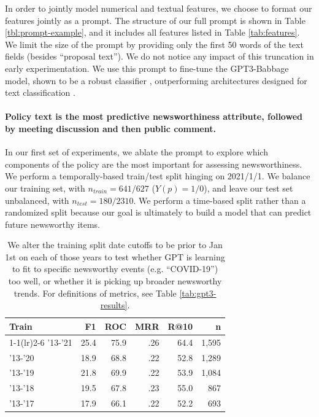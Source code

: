 \documentclass[11pt]{article}
\begin{document}
In order to jointly model numerical and textual features, we choose to format our features jointly as a prompt. The structure of our full prompt is shown in Table \ref{tbl:prompt-example}, and it includes all features listed in Table \ref{tab:features}. We limit the size of the prompt by providing only the first 50 words of the text fields (besides ``proposal text''). We do not notice any impact of this truncation in early experimentation. We use this prompt to fine-tune the GPT3-Babbage model, shown to be a robust classifier \cite{spangher2023identifying}, outperforming architectures designed for text classification \cite{spangher2021multitask}. %

\paragraph{Policy text is the most predictive newsworthiness attribute, followed by meeting discussion and then public comment.}

In our first set of experiments, we ablate the prompt to explore which components of the policy are the most important for assessing newsworthiness.
We perform a temporally-based train/test split hinging on 2021/1/1. We balance our training set, with $n_{train}=641/627$ ($Y(p)=1/0$), and leave our test set unbalanced, with $n_{test}=180/2310$. We perform a time-based split rather than a randomized split because our goal is ultimately to build a model that can predict future newsworthy items. 

\begin{table}[t]
    \centering
    \begin{tabularx}{\linewidth}{lrrrrr}
        \toprule
         Train & F1 & ROC &  MRR & R@10 & n\\
         \cmidrule(lr){1-1}\cmidrule(lr){2-6}
         '13-'21 & 25.4 & 75.9 & .26 &  64.4 & 1,595 \\
         '13-'20 & 18.9 & 68.8 & .22 &  52.8 & 1,289 \\
         '13-'19 & 21.8 & 69.9 & .22 &  53.9 & 1,084 \\
         '13-'18 & 19.5 & 67.8 & .23 &  55.0 & 867 \\
         '13-'17 & 17.9 & 66.1 & .22 &  52.2 & 693 \\
         \bottomrule
    \end{tabularx}
    \caption{We alter the training split date cutoffs to be prior to Jan 1st on each of those years to test whether GPT is learning to fit to specific newsworthy events (e.g. ``COVID-19'') too well, or whether it is picking up broader newsworthy trends. For definitions of metrics, see Table \ref{tab:gpt3-results}.}
    \label{tbl:newsworthiness-by-time}
\end{table}
\end{document}
